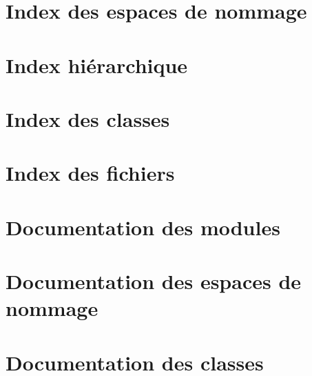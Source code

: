 \let\mypdfximage\pdfximage\def\pdfximage{\immediate\mypdfximage}\documentclass[twoside]{book}
\newcommand{\+}{\discretionary{\mbox{\scriptsize$\hookleftarrow$}}{}{}}
\begin{document}
\chapter{Index des espaces de nommage}

\chapter{Index hiérarchique}

\chapter{Index des classes}

\chapter{Index des fichiers}

\chapter{Documentation des modules}

\chapter{Documentation des espaces de nommage}

\chapter{Documentation des classes}









































\end{document}
